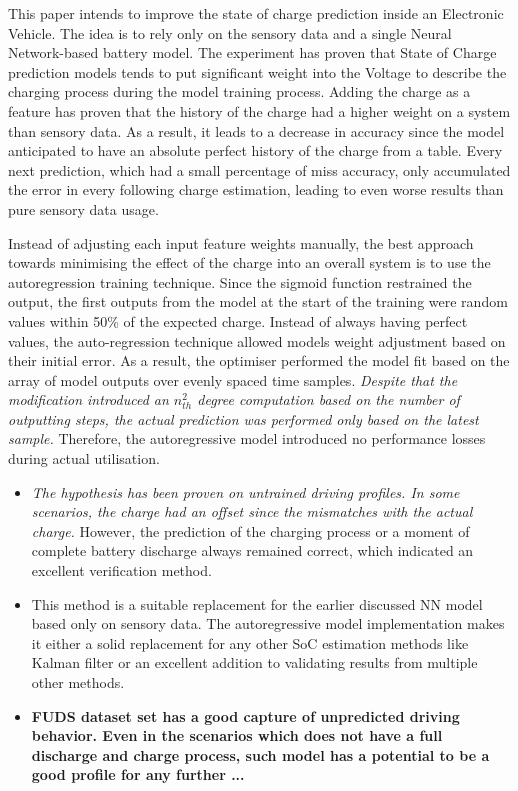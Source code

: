 This paper intends to improve the state of charge prediction inside an Electronic Vehicle.
The idea is to rely only on the sensory data and a single Neural Network-based battery model.
The experiment has proven that State of Charge prediction models tends to put significant weight into the Voltage to describe the charging process during the model training process.
Adding the charge as a feature has proven that the history of the charge had a higher weight on a system than sensory data.
As a result, it leads to a decrease in accuracy since the model anticipated to have an absolute perfect history of the charge from a table.
Every next prediction, which had a small percentage of miss accuracy, only accumulated the error in every following charge estimation, leading to even worse results than pure sensory data usage.

%
%
Instead of adjusting each input feature weights manually, the best approach towards minimising the effect of the charge into an overall system is to use the autoregression training technique.
Since the sigmoid function restrained the output, the first outputs from the model at the start of the training were random values within 50\% of the expected charge.
Instead of always having perfect values, the auto-regression technique allowed models weight adjustment based on their initial error.
As a result, the optimiser performed the model fit based on the array of model outputs over evenly spaced time samples.
\textit{Despite that the modification introduced an $n_{th}^{2}$ degree computation based on the number of outputting steps, the actual prediction was performed only based on the latest sample.}
Therefore, the autoregressive model introduced no performance losses during actual utilisation. 

\begin{itemize}
    \item \textit{The hypothesis has been proven on untrained driving profiles. In some scenarios, the charge had an offset since the mismatches with the actual charge.}
    However, the prediction of the charging process or a moment of complete battery discharge always remained correct, which indicated an excellent verification method. \\
    
    \item This method is a suitable replacement for the earlier discussed NN model based only on sensory data.
    The autoregressive model implementation makes it either a solid replacement for any other SoC estimation methods like Kalman filter or an excellent addition to validating results from multiple other methods.

    \item \textbf{FUDS dataset set has a good capture of unpredicted driving behavior. Even in the scenarios which does not have a full discharge and charge process, such model has a potential to be a good profile for any further ...}

\end{itemize}